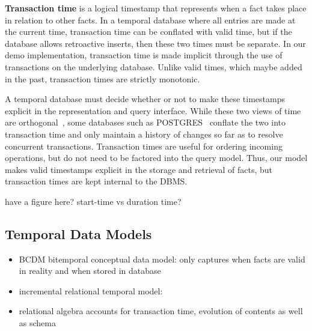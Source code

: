 \textbf{Transaction time} is a logical timestamp that represents when a fact
takes place in relation to other facts. In a temporal database where all
entries are made at the current time, transaction time can be conflated with
valid time, but if the database allows retroactive inserts, then these two
times must be separate. In our demo implementation, transaction time is made
implicit through the use of transactions on the underlying database. Unlike
valid times, which maybe added in the past, transaction times are strictly
monotonic.

A temporal database must decide whether or not to make these timestamps
explicit in the representation and query interface.  While these two views of
time are orthogonal~\cite{snodgrass1986temporal}, some databases such as
POSTGRES~\cite{stonebraker1990implementation} conflate the two into transaction
time and only maintain a history of changes so far as to resolve concurrent
transactions. Transaction times are useful for ordering incoming operations,
but do not need to be factored into the query model. Thus, our model makes
valid timestamps explicit in the storage and retrieval of facts, but
transaction times are kept internal to the DBMS.

have a figure here? start-time vs duration time?
\fi

\subsection{Temporal Data Models}

\begin{itemize}
\item BCDM bitemporal conceptual data model: only captures when facts are valid in reality and when stored in database~\cite{jensen1996semantics}\cite{jensen1994unifying}
\item incremental relational temporal model: \cite{jensen1991incremental}
\item relational algebra accounts for transaction time, evolution of contents as well as schema~\cite{mckenzie1990schema}
\end{itemize}


